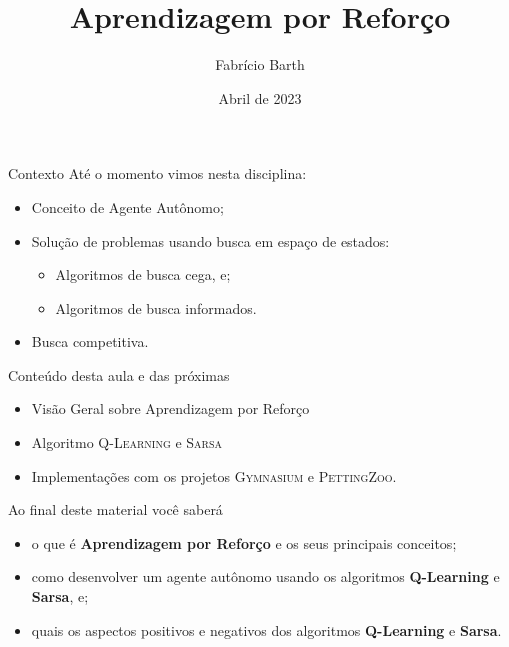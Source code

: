 \documentclass{beamer}
\begin{document}
\title{Aprendizagem por Reforço} 
\author{Fabrício Barth}
\date{Abril de 2023}

\maketitle

\begin{frame}{Contexto}
Até o momento vimos nesta disciplina:
\begin{itemize}
	\item Conceito de Agente Autônomo;
	\item Solução de problemas usando busca em espaço de estados:
	\begin{itemize}
		\item Algoritmos de busca cega, e;
		\item Algoritmos de busca informados.
	\end{itemize}
	\item Busca competitiva.
\end{itemize}
\end{frame}

\begin{frame}{Conteúdo desta aula e das próximas}
  \begin{itemize}
\item Visão Geral sobre Aprendizagem por Reforço
\item Algoritmo \textsc{Q-Learning} e \textsc{Sarsa}
\item Implementações com os projetos \textsc{Gymnasium} e \textsc{PettingZoo}.
  \end{itemize}
\end{frame}

\begin{frame}{Ao final deste material você saberá}

	\begin{itemize}
	\item o que é \textbf{Aprendizagem por Reforço} e os seus principais conceitos;
	\item como desenvolver um agente autônomo usando os algoritmos \textbf{Q-Learning} e \textbf{Sarsa}, e;
	\item quais os aspectos positivos e negativos dos algoritmos \textbf{Q-Learning} e \textbf{Sarsa}.
	\end{itemize}

\end{frame}
\end{document}
